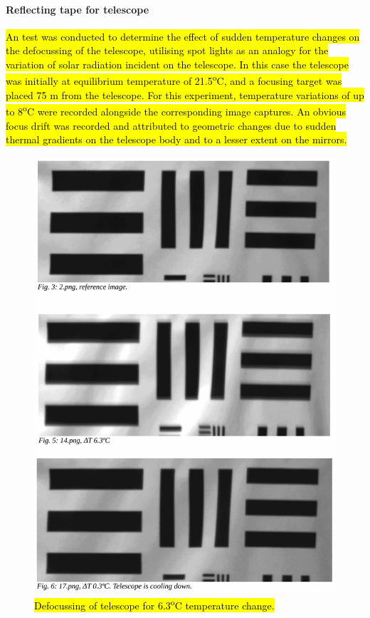 \paragraph{Reflecting tape for telescope}
\hl{An test was conducted to determine the effect of sudden temperature changes on the defocussing of the telescope, utilising spot lights as an analogy for the variation of solar radiation incident on the telescope. In this case the telescope was initially at equilibrium temperature of 21.5\textsuperscript{o}C, and a focusing target was placed 75 m from the telescope. For this experiment, temperature variations of up to 8\textsuperscript{o}C were recorded alongside the corresponding image captures. An obvious focus drift was recorded and attributed to geometric changes due to sudden thermal gradients on the telescope body and to a lesser extent on the mirrors.}


	\begin{figure}[H]
    \centering	
	\includegraphics[scale=0.2]{4-experiment-design/img/mechanical/focusdrift.png}
	\caption{\hl{Defocussing of telescope for 6.3\textsuperscript{o}C temperature change.}}
	\label{fig:focusdrift}
    	\end{figure}
 
